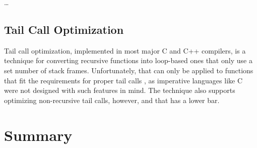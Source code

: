 \todo\dots

\subsection{Tail Call Optimization}
Tail call%
optimization, implemented in most major C and C++ compilers, is a technique
for converting recursive functions into loop-based ones that only use
a set number of stack frames.
Unfortunately, that can only be applied to functions that fit the requirements
for proper tail calls \autocite{probst2001proper},
as imperative languages like C were not designed with such features in mind.
The technique also supports optimizing non-recursive tail calls, however,
and that has a lower bar.

\section{Summary}

